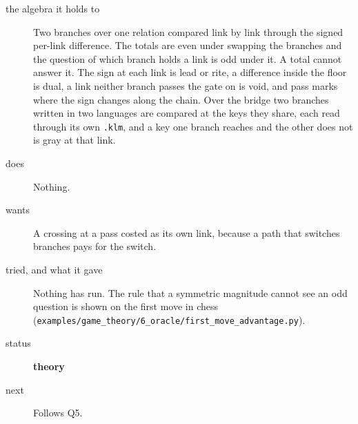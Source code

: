 \begin{description}
\item[{the algebra it holds to}] Two branches over one relation compared link by link through the signed per-link difference. The totals are even under swapping the branches and the question of which branch holds a link is odd under it. A total cannot answer it. The sign at each link is lead or rite, a difference inside the floor is dual, a link neither branch passes the gate on is void, and pass marks where the sign changes along the chain. Over the bridge two branches written in two languages are compared at the keys they share, each read through its own \texttt{.\allowbreak{}klm}, and a key one branch reaches and the other does not is gray at that link.
\item[{does}] Nothing.
\item[{wants}] A crossing at a pass costed as its own link, because a path that switches branches pays for the switch.
\item[{tried, and what it gave}] Nothing has run. The rule that a symmetric magnitude cannot see an odd question is shown on the first move in chess (\texttt{examples/\allowbreak{}game\_\allowbreak{}theory/\allowbreak{}6\_\allowbreak{}oracle/\allowbreak{}first\_\allowbreak{}move\_\allowbreak{}advantage.\allowbreak{}py}).
\item[{status}] \textbf{theory}
\item[{next}] Follows Q5.
\end{description}


